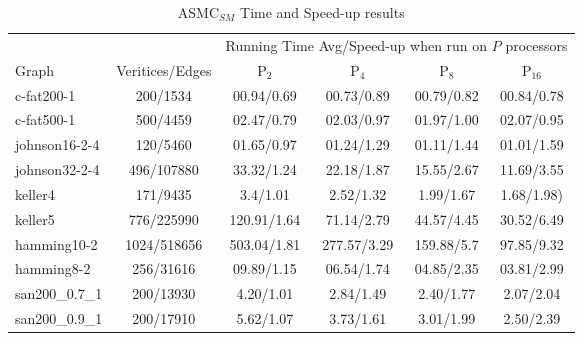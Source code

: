 \documentclass[11pt]{article}
\begin{document}
\linespread{1}
\begin{table*}[ht!]
\caption{ASMC$_{SM}$ Time and Speed-up results}\label{tab:spar_su_par_table}
\begin{footnotesize}
\begin{center}
\begin{tabular}{|l||c||c|c|c|c|}
\hline
&              & \multicolumn{4}{|c|}{Running Time Avg/Speed-up when run on $P$ processors}\\
\cline{3-6}
Graph&Veritices/Edges& 	P$_2$           &P$_4$            &P$_8$            &P$_{16}$   \\
\hline
c-fat200-1 	    &200/1534 		 &00.94/0.69 &00.73/0.89 &00.79/0.82 &00.84/0.78\\  %
c-fat500-1 	    &500/4459 		 &02.47/0.79 &02.03/0.97 &01.97/1.00 &02.07/0.95\\  %
\hline                                                                                   
johnson16-2-4 	&120/5460 		 &01.65/0.97 &01.24/1.29 &01.11/1.44 &01.01/1.59\\  %
johnson32-2-4 	&496/107880 	 &33.32/1.24 &22.18/1.87 &15.55/2.67 &11.69/3.55\\  %
\hline                                  
keller4      	&171/9435 		 &3.4/1.01     &2.52/1.32     &1.99/1.67   &1.68/1.98)\\  %
keller5 	    &776/225990 	 &120.91/1.64 &71.14/2.79 &44.57/4.45 &30.52/6.49\\
\hline                                                                                   
hamming10-2 	&1024/518656 	 &503.04/1.81 &277.57/3.29 &159.88/5.7  &97.85/9.32\\
hamming8-2 	    &256/31616 	     &09.89/1.15 &06.54/1.74 &04.85/2.35 &03.81/2.99\\
\hline                                                                                   
san200\_0.7\_1 	&200/13930 	     &4.20/1.01 &2.84/1.49 &2.40/1.77 &2.07/2.04\\%
san200\_0.9\_1 	&200/17910 	     &5.62/1.07 &3.73/1.61 &3.01/1.99 &2.50/2.39\\

\end{tabular}
\end{center}
\end{footnotesize}
\end{table*}
\end{document}
